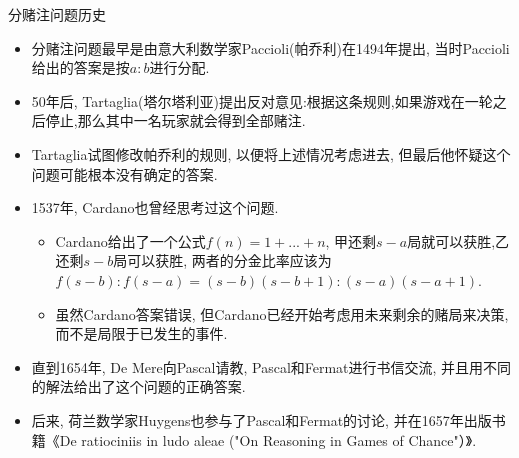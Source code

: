 \documentclass[Prob-All.tex]{subfiles}
\begin{document}




\begin{frame}{分赌注问题历史}
	\vspace{-0.15cm}
\begin{itemize}[<+-|alert@+>]
	\item 分赌注问题最早是由意大利数学家Paccioli(帕乔利)在1494年提出, 当时Paccioli给出的答案是按$a:b$进行分配.
	\item 50年后, Tartaglia(塔尔塔利亚)提出反对意见:根据这条规则,如果游戏在一轮之后停止,那么其中一名玩家就会得到全部赌注.
	\item Tartaglia试图修改帕乔利的规则, 以便将上述情况考虑进去, 但最后他怀疑这个问题可能根本没有确定的答案.
	\item 1537年, Cardano也曾经思考过这个问题.
	\begin{itemize}[<+-|alert@+>]
		\item Cardano给出了一个公式$f(n)=1+...+n$, 甲还剩$s-a$局就可以获胜,乙还剩$s-b$局可以获胜, 两者的分金比率应该为$f(s-b):f(s-a)=(s-b)(s-b+1):(s-a)(s-a+1)$.
		\item 虽然Cardano答案错误, 但Cardano已经开始考虑用未来剩余的赌局来决策,而不是局限于已发生的事件.
	\end{itemize}
    \item 直到1654年, De Mere向Pascal请教, Pascal和Fermat进行书信交流, 并且用不同的解法给出了这个问题的正确答案.
    \item 后来, 荷兰数学家Huygens也参与了Pascal和Fermat的讨论, 并在1657年出版书籍《De ratiociniis in ludo aleae ("On Reasoning in Games of Chance"）》.

\end{itemize}


\end{frame}
\end{document}
